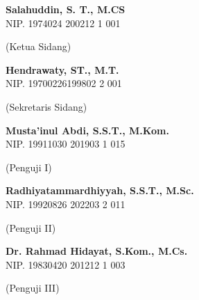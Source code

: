 \documentclass[12pt, a4paper, onecolumn, oneside]{report}
\begin{document}
\noindent
\begin{minipage}[t]{0.6\textwidth}
{\bfseries Salahuddin, S. T., M.CS}\\
NIP. 1974024 200212 1 001
\end{minipage}%
\begin{minipage}[t]{0.4\textwidth}
(Ketua Sidang)
\end{minipage}

\vspace{0.7cm}

\noindent
\begin{minipage}[t]{0.6\textwidth}
{\bfseries Hendrawaty, ST., M.T.}\\
NIP. 19700226199802 2 001
\end{minipage}%
\begin{minipage}[t]{0.4\textwidth}
(Sekretaris Sidang)
\end{minipage}

\vspace{0.7cm}

\noindent
\begin{minipage}[t]{0.6\textwidth}
{\bfseries Musta’inul Abdi, S.S.T., M.Kom.}\\
NIP. 19911030 201903 1 015
\end{minipage}%
\begin{minipage}[t]{0.4\textwidth}
(Penguji I)
\end{minipage}

\vspace{0.7cm}

\noindent
\begin{minipage}[t]{0.6\textwidth}
{\bfseries Radhiyatammardhiyyah, S.S.T., M.Sc.}\\
NIP. 19920826 202203 2 011
\end{minipage}%
\begin{minipage}[t]{0.4\textwidth}
(Penguji II)
\end{minipage}

\vspace{0.7cm}

\noindent
\begin{minipage}[t]{0.6\textwidth}
{\bfseries Dr. Rahmad Hidayat, S.Kom., M.Cs.}\\
NIP. 19830420 201212 1 003
\end{minipage}%
\begin{minipage}[t]{0.4\textwidth}
(Penguji III)
\end{minipage}

\vspace{1cm}
\end{document}
